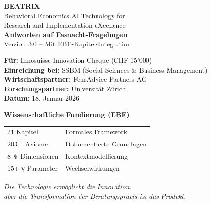 \documentclass[11pt,a4paper]{article}
\begin{document}

\begin{titlepage}
\centering
\vspace*{2cm}

{\Huge\bfseries\textcolor{innoblue}{BEATRIX}}\\[0.5cm]
{\Large Behavioral Economics AI Technology for\\Research and Implementation eXcellence}\\[2cm]

{\LARGE\bfseries Antworten auf Fasnacht-Fragebogen}\\[0.5cm]
{\large Version 3.0 – Mit EBF-Kapitel-Integration}\\[2cm]

\begin{tcolorbox}[colback=innoblue!10!white, colframe=innoblue!75!black, width=12cm]
\centering
\textbf{Für:} Innosuisse Innovation Cheque (CHF 15'000)\\[0.3cm]
\textbf{Einreichung bei:} SSBM (Social Sciences \& Business Management)\\[0.3cm]
\textbf{Wirtschaftspartner:} FehrAdvice Partners AG\\[0.3cm]
\textbf{Forschungspartner:} Universität Zürich\\[0.3cm]
\textbf{Datum:} 18. Januar 2026
\end{tcolorbox}

\vfill

\begin{tcolorbox}[colback=ebfpurple!10!white, colframe=ebfpurple!75!black, width=14cm]
\centering
\textbf{Wissenschaftliche Fundierung (EBF)}\\[0.3cm]
\begin{tabular}{ll}
21 Kapitel & Formales Framework \\
203+ Axiome & Dokumentierte Grundlagen \\
8 Ψ-Dimensionen & Kontextmodellierung \\
15+ γ-Parameter & Wechselwirkungen \\
\end{tabular}
\end{tcolorbox}

\vspace{1cm}
{\small\textit{Die Technologie ermöglicht die Innovation,\\aber die Transformation der Beratungspraxis ist das Produkt.}}

\end{titlepage}
\end{document}
